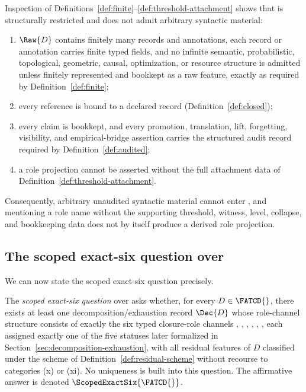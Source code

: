 \begin{proposition}\label{prop:non-overbreadth}
Inspection of Definitions~\ref{def:finite}--\ref{def:threshold-attachment}
shows that \FATCD{} is structurally restricted and does not admit arbitrary
syntactic material:
\begin{enumerate}[label=(\roman*),topsep=2pt,itemsep=1pt]
  \item \(\Raw{D}\) contains finitely many records and annotations, each
    record or annotation carries finite typed fields, and no infinite
    semantic, probabilistic, topological, geometric, causal, optimization, or
    resource structure is admitted unless finitely represented and bookkept as
    a raw feature, exactly as required by Definition~\ref{def:finite};
  \item every reference is bound to a declared record
    (Definition~\ref{def:closed});
  \item every claim is bookkept, and every promotion, translation, lift,
    forgetting, visibility, and empirical-bridge assertion carries the
    structured audit record required by
    Definition~\ref{def:audited};
  \item a role projection cannot be asserted without the full attachment
    data of Definition~\ref{def:threshold-attachment}.
\end{enumerate}
Consequently, arbitrary unaudited syntactic material cannot enter \FATCD{},
and mentioning a role name without the supporting threshold, witness, level,
collapse, and bookkeeping data does not by itself produce a derived role
projection.
\end{proposition}

\subsection{The scoped exact-six question over \FATCD{}}\label{subsec:scoped-exact-six-question}

We can now state the scoped exact-six question precisely.

\begin{definition}\label{def:scoped-exact-six-question}
The \emph{scoped exact-six question} over \FATCD{} asks whether, for every
\(D \in \FATCD{}\), there exists at least one decomposition/exhaustion record
\(\Dec{D}\) whose role-channel structure consists of exactly the six typed
closure-role channels \Pone{}, \Ptwo{}, \Pthree{}, \Pfour{}, \Pfive{},
\Psix{}, each assigned exactly one of the five statuses later formalized in
Section~\ref{sec:decomposition-exhaustion}, with all residual features of
\(D\) classified under the scheme of Definition~\ref{def:residual-scheme}
without recourse to categories (x) or (xi). No uniqueness is built into this
question. The affirmative answer is denoted \(\ScopedExactSix{\FATCD{}}\).
\end{definition}

